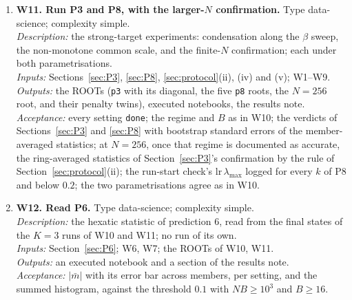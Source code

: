 \documentclass[11pt,a4paper]{article}
\newcommand{\code}[1]{\texttt{#1}}
\begin{document}
\begin{enumerate}[leftmargin=2em,itemsep=5pt]
  \item \textbf{W11. Run P3 and P8, with the larger-$N$ confirmation.} Type data-science; complexity simple.\\
  \emph{Description:} the strong-target experiments: condensation along the $\beta$ sweep, the non-monotone common scale, and the finite-$N$ confirmation; each under both parametrisations.\\
  \emph{Inputs:} Sections~\ref{sec:P3}, \ref{sec:P8}, \ref{sec:protocol}(ii), (iv) and (v); W1--W9.\\
  \emph{Outputs:} the ROOTs (\code{p3} with its diagonal, the five \code{p8} roots, the $N = 256$ root, and their penalty twins), executed notebooks, the results note.\\
  \emph{Acceptance:} every setting \code{done}; the regime and $B$ as in W10; the verdicts of Sections~\ref{sec:P3} and \ref{sec:P8} with bootstrap standard errors of the member-averaged statistics; at $N = 256$, once that regime is documented as accurate, the ring-averaged statistics of Section~\ref{sec:P3}'s confirmation by the rule of Section~\ref{sec:protocol}(ii); the run-start check's $\mathrm{lr}\,\lambda_{\max}$ logged for every $k$ of P8 and below $0.2$; the two parametrisations agree as in W10.
  \item \textbf{W12. Read P6.} Type data-science; complexity simple.\\
  \emph{Description:} the hexatic statistic of prediction 6, read from the final states of the $K = 3$ runs of W10 and W11; no run of its own.\\
  \emph{Inputs:} Section~\ref{sec:P6}; W6, W7; the ROOTs of W10, W11.\\
  \emph{Outputs:} an executed notebook and a section of the results note.\\
  \emph{Acceptance:} $|\bar m|$ with its error bar across members, per setting, and the summed histogram, against the threshold $0.1$ with $NB\ge10^3$ and $B\ge16$.
\end{enumerate}
\appendix
\end{document}
